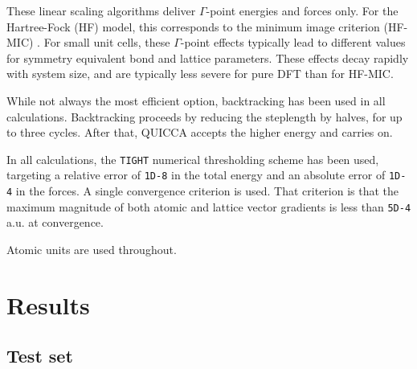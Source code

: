 \twolinestyle{\documentclass[prb,preprint]{revtex4}}
\begin{document}
These linear scaling algorithms deliver $\Gamma$-point energies and forces only.  
For the Hartree-Fock (HF) model, this corresponds to the minimum image criterion 
(HF-MIC) \cite{CTymczak05a}.  For small unit cells, these $\Gamma$-point effects typically lead 
to different values for symmetry equivalent bond and lattice parameters.  These effects 
decay rapidly with system size, and are typically less severe for pure DFT than for HF-MIC.  

While not always the most efficient option, backtracking has been used in all calculations.
Backtracking proceeds by reducing the steplength by halves, for up to three cycles.  
After that, QUICCA accepts the higher energy and carries on.  

In all calculations, the {\tt TIGHT} numerical thresholding scheme \cite{CTymczak05a} has been used, 
targeting a relative error of {\tt 1D-8} in the total energy and an 
absolute error of {\tt 1D-4} in the forces.  A single convergence criterion is used.
That criterion is that the maximum magnitude of both atomic and lattice vector gradients 
is less than {\tt 5D-4} a.u. at convergence.

Atomic units are used throughout.

\section{Results} \label{results}

\subsection{Test set}
\end{document}
